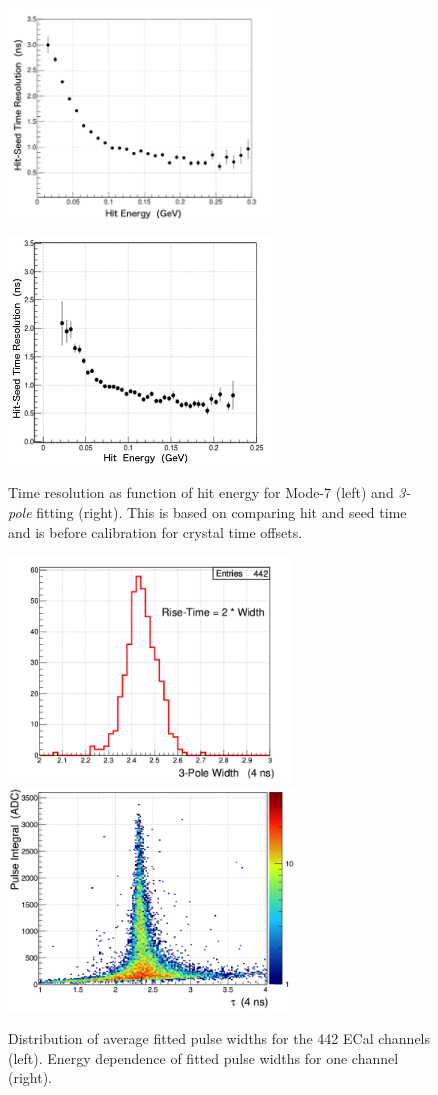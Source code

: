 \documentclass[amsmath,amssymb,notitlepage,12pt]{revtex4-1}
\begin{document}
\begin{figure}[htbp]\centering
  \includegraphics[height=6.1cm,width=7cm]{pics/mode7reso.png}
  \includegraphics[width=7cm]{pics/fitreso.png}
  \caption{Time resolution as function of hit energy for Mode-7 (left) and {\em 3-pole} fitting (right).  This is based on comparing hit and seed time and is before calibration for crystal time offsets.\label{fig:timeReso}}
\end{figure}
\begin{figure}[htbp]\centering
  \includegraphics[height=6cm]{pics/pulseWidths.png}
  \includegraphics[height=5.9cm]{pics/pulseWidthEnergy.png}
  \caption{Distribution of average fitted pulse widths for the 442 ECal channels (left).  Energy dependence of fitted pulse widths for one channel (right).\label{fig:pulseWidths}}
\end{figure}
\end{document}
